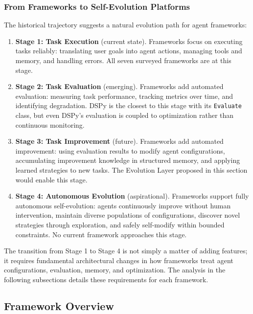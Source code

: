 \subsubsection{From Frameworks to Self-Evolution Platforms}

The historical trajectory suggests a natural evolution path for agent frameworks:

\begin{enumerate}
    \item \textbf{Stage 1: Task Execution} (current state). Frameworks focus on executing tasks reliably: translating user goals into agent actions, managing tools and memory, and handling errors. All seven surveyed frameworks are at this stage.

    \item \textbf{Stage 2: Task Evaluation} (emerging). Frameworks add automated evaluation: measuring task performance, tracking metrics over time, and identifying degradation. DSPy is the closest to this stage with its \texttt{Evaluate} class, but even DSPy's evaluation is coupled to optimization rather than continuous monitoring.

    \item \textbf{Stage 3: Task Improvement} (future). Frameworks add automated improvement: using evaluation results to modify agent configurations, accumulating improvement knowledge in structured memory, and applying learned strategies to new tasks. The Evolution Layer proposed in this section would enable this stage.

    \item \textbf{Stage 4: Autonomous Evolution} (aspirational). Frameworks support fully autonomous self-evolution: agents continuously improve without human intervention, maintain diverse populations of configurations, discover novel strategies through exploration, and safely self-modify within bounded constraints. No current framework approaches this stage.
\end{enumerate}

The transition from Stage 1 to Stage 4 is not simply a matter of adding features; it requires fundamental architectural changes in how frameworks treat agent configurations, evaluation, memory, and optimization. The analysis in the following subsections details these requirements for each framework.


\subsection{Framework Overview}

